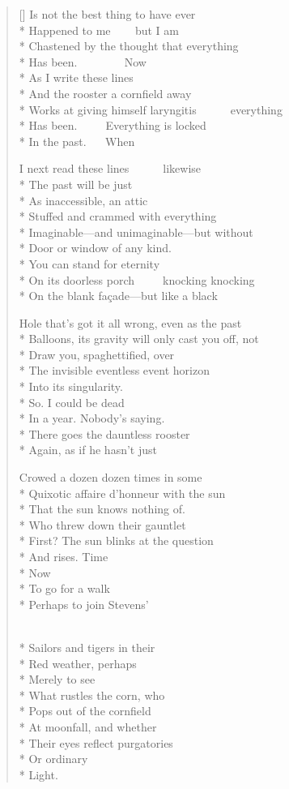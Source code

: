 \label{ch:lung_cancer}
\settowidth{\versewidth}{Works at giving himself laryngitis       everything}
\begin{verse}[\versewidth]
Is not the best thing to have ever\\*
Happened to me     but I am\\*
Chastened by the thought that everything\\*
Has been.          Now\\*
As I write these lines\\*
And the rooster a cornfield away\\*
Works at giving himself laryngitis       everything\\*
Has been.      Everything is locked\\*
In the past.    When

I next read these lines       likewise\\*
The past will be just\\*
As inaccessible, an attic\\*
Stuffed and crammed with everything\\*
Imaginable---and unimaginable---but without\\*
Door or window of any kind.\\*
You can stand for eternity\\*
On its doorless porch      knocking knocking\\*
On the blank façade---but like a black

Hole that's got it all wrong, even as the past\\*
Balloons, its gravity will only cast you off, not\\*
Draw you, spaghettified, over\\*
The invisible eventless event horizon\\*
Into its singularity.\\*
So.      I could be dead\\*
In a year. Nobody's saying.\\*
There goes the dauntless rooster\\*
Again, as if he hasn't just

Crowed a dozen dozen times in some\\*
Quixotic affaire d'honneur with the sun\\*
That the sun knows nothing of.\\*
Who threw down their gauntlet\\*
First? The sun blinks at the question\\*
And rises. Time\\*
Now\\*
To go for a walk\\*
Perhaps to join Stevens'

\\*
Sailors and tigers in their\\*
Red weather, perhaps\\*
Merely to see\\*
What rustles the corn, who\\*
Pops out of the cornfield\\*
At moonfall, and whether\\*
Their eyes reflect purgatories\\*
Or ordinary\\*
Light.
\end{verse}

